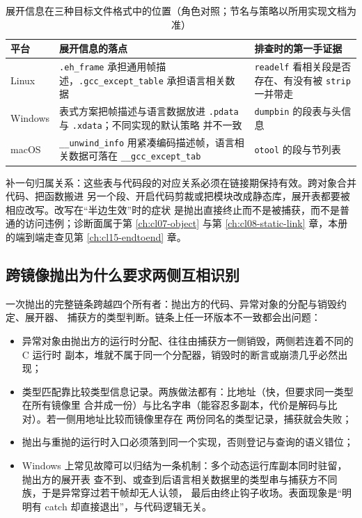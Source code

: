 \documentclass[12pt,a4paper,fontset=fandol]{ctexbook}
\newcommand{\Tp}[1]{\texttt{#1}}
\newcommand{\Lang}[1]{\textsf{#1}}
\newcommand{\CL}{\Lang{C}}
\newcommand{\Tool}[1]{\texttt{#1}}
\newcommand{\Sect}[1]{\texttt{.#1}}
\newcommand{\Nix}{\textsf{Linux}}
\newcommand{\Win}{\textsf{Windows}}
\newcommand{\Mac}{\textsf{macOS}}
\begin{document}
\begin{table}
\centering
\begin{tabular}{@{}>{\raggedright\arraybackslash}p{} >{\raggedright\arraybackslash}p{} >{\raggedright\arraybackslash}p{}@{}}
\toprule
平台 & 展开信息的落点 & 排查时的第一手证据 \\
\midrule
\Nix{} & \Sect{eh\_frame} 承担通用帧描述，\Sect{gcc\_except\_table} 承担语言相关数据 &
\Tool{readelf} 看相关段是否存在、有没有被 \Tool{strip} 一并带走 \\
\Win{} & 表式方案把帧描述与语言数据放进 \Sect{pdata} 与 \Sect{xdata}；不同实现的默认策略
并不一致 & \Tool{dumpbin} 的段表与头信息 \\
\Mac{} & \Tp{\_\_unwind\_info} 用紧凑编码描述帧，语言相关数据可落在
\Tp{\_\_gcc\_except\_tab} & \Tool{otool} 的段与节列表 \\
\bottomrule
\end{tabular}
\caption{展开信息在三种目标文件格式中的位置（角色对照；节名与策略以所用实现文档为准）}
\label{tab:cl13-unwind}
\end{table}

补一句归属关系：这些表与代码段的对应关系必须在链接期保持有效。跨对象合并代码、把函数搬进
另一个段、开启代码剪裁或把模块改成静态库，展开表都要被相应改写。改写在“半边生效”时的症状
是抛出直接终止而不是被捕获，而不是普通的访问违例；诊断面属于第 \ref{ch:cl07-object} 与第
\ref{ch:cl08-static-link} 章，本册的端到端走查见第 \ref{ch:cl15-endtoend} 章。

\subsection{跨镜像抛出为什么要求两侧互相识别}\label{sec:cl13-cross-image}

一次抛出的完整链条跨越四个所有者：抛出方的代码、异常对象的分配与销毁约定、展开器、
捕获方的类型判断。链条上任一环版本不一致都会出问题：

\begin{itemize}
\item 异常对象由抛出方的运行时分配、往往由捕获方一侧销毁，两侧若连着不同的 \CL{} 运行时
副本，堆就不属于同一个分配器，销毁时的断言或崩溃几乎必然出现；
\item 类型匹配靠比较类型信息记录。两族做法都有：比地址（快，但要求同一类型在所有镜像里
合并成一份）与比名字串（能容忍多副本，代价是解码与比对）。若一侧用地址比较而镜像里存在
两份同名的类型记录，捕获就会失败；
\item 抛出与重抛的运行时入口必须落到同一个实现，否则登记与查询的语义错位；
\item \Win{} 上常见故障可以归结为一条机制：多个动态运行库副本同时驻留，抛出方的展开表
查不到、或查到后语言相关数据里的类型串与捕获方不同族，于是异常穿过若干帧却无人认领，
最后由终止钩子收场。表面现象是“明明有 catch 却直接退出”，与代码逻辑无关。
\end{itemize}
\end{document}
